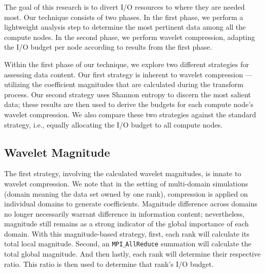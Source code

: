 The goal of this research is to divert I/O resources to where they are needed most. 
%
Our technique consists of two phases. 
%
In the first phase, we perform a lightweight analysis step to determine the most pertinent data among all the compute nodes. 
%
In the second phase, we perform wavelet compression, adapting the I/O budget per node according to results from the first phase.

Within the first phase of our technique, we explore two different strategies for assessing data content.
%
Our first strategy is inherent to wavelet compression --- utilizing the coefficient magnitudes that are calculated during the transform process. 
%
Our second strategy uses Shannon entropy to discern the most salient data;
these results are then used to derive the budgets for each compute node's wavelet compression.
%
We also compare these two strategies against the standard strategy, i.e.,
equally allocating the I/O budget to all compute nodes. 

\vspace{-1.3em}
\subsection{Wavelet Magnitude}
%
The first strategy, involving the calculated wavelet magnitudes, is innate to wavelet compression. 
%
We note that in the setting of multi-domain simulations (domain meaning the
data set owned by one rank), 
compression is applied on individual domains to generate coefficients.
%
Magnitude difference across domains no longer necessarily warrant difference in information content; 
nevertheless, magnitude still remains as a strong indicator of the global importance of each domain.
%
%
With this magnitude-based strategy, first, each rank will calculate its total local magnitude.
%
Second, an \texttt{MPI$\_$AllReduce} summation will calculate the total global magnitude.
%
And then lastly, each rank will determine their respective ratio. 
%
This ratio is then used to determine that rank's I/O budget. 

\vspace{-1.3em}

